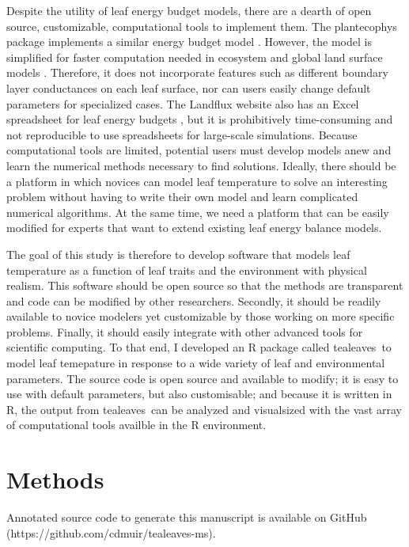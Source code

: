 \documentclass[11pt, oneside]{article}
\newcommand{\pkg}[1]{{\fontseries{b}\selectfont #1}}
\newcommand{\tealeaves}{\pkg{tealeaves}}
\begin{document}
Despite the utility of leaf energy budget models, there are a dearth of open source, customizable, computational tools to implement them. The \pkg{plantecophys} package implements a similar energy budget model \citep{Duursma_2015}. However, the model is simplified for faster computation needed in ecosystem and global land surface models \citep{Leuning_1995}. Therefore, it does not incorporate features such as different boundary layer conductances on each leaf surface, nor can users easily change default parameters for specialized cases. The Landflux website also has an Excel spreadsheet for leaf energy budgets \citep{Landflux_2019}, but it is prohibitively time-consuming and not reproducible to use spreadsheets for large-scale simulations. Because computational tools are limited, potential users must develop models anew and learn the numerical methods necessary to find solutions. Ideally, there should be a platform in which novices can model leaf temperature to solve an interesting problem without having to write their own model and learn complicated numerical algorithms. At the same time, we need a platform that can be easily modified for experts that want to extend existing leaf energy balance models.

The goal of this study is therefore to develop software that models leaf temperature as a function of leaf traits and the environment with physical realism. This software should be open source so that the methods are transparent and code can be modified by other researchers. Secondly, it should be readily available to novice modelers yet customizable by those working on more specific problems. Finally, it should easily integrate with other advanced tools for scientific computing. To that end, I developed an R package called \tealeaves~to model leaf temepature in response to a wide variety of leaf and environmental parameters. The source code is open source and available to modify; it is easy to use with default parameters, but also customisable; and because it is written in R, the output from \tealeaves~can be analyzed and visualsized with the vast array of computational tools availble in the R environment. 

\section*{Methods}

Annotated source code to generate this manuscript is available on GitHub (https://github.com/cdmuir/tealeaves-ms).
\end{document}
